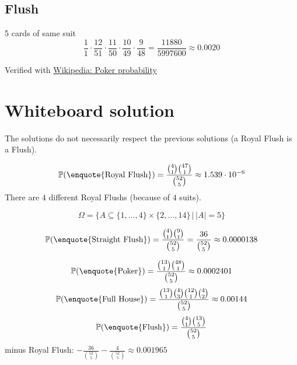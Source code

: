 \documentclass{article}
\begin{document}
\subsection{Flush}
5 cards of same suit
\[ \frac{1}{1} \cdot \frac{12}{51} \cdot \frac{11}{50} \cdot \frac{10}{49} \cdot \frac{9}{48} = \frac{11880}{5997600} \approx 0.0020 \]

Verified with \href{https://en.wikipedia.org/wiki/Poker_probability}{Wikipedia: Poker probability}

\section{Whiteboard solution}

The solutions do not necessarily respect the previous solutions (a Royal Flush is a Flush).

\[ \mathbb P(\text{\enquote{Royal Flush}}) = \frac{{4 \choose 1} {47 \choose 1}}{{52 \choose 5}} \approx 1.539 \cdot 10^{-6} \]
There are $4$ different Royal Flushs (because of $4$ suits).

\[ \Omega = \{A \subseteq \{1, \dots, 4\} \times \{2, \dots, 14\} \,|\, |A| = 5\} \]

\[ \mathbb P(\text{\enquote{Straight Flush}}) = \frac{{4 \choose 1} {9 \choose 1}}{{52 \choose 5}} = \frac{36}{{52 \choose 5}} \approx 0.0000138 \]

\[ \mathbb P(\text{\enquote{Poker}}) = \frac{{13 \choose 1} {48 \choose 1}}{{52 \choose 5}} \approx 0.0002401 \]
\[ \mathbb P(\text{\enquote{Full House}}) = \frac{{13 \choose 1} {4 \choose 3} {12 \choose 1} {4 \choose 2}}{{52 \choose 5}} \approx 0.00144 \]
\[ \mathbb P(\text{\enquote{Flush}}) = \frac{{4 \choose 1} {13 \choose 5}}{{52 \choose 5}} \]
minus Royal Flush: $- \frac{36}{{52 \choose 5}} - \frac{4}{{52 \choose 5}} \approx 0.001965$
\end{document}
